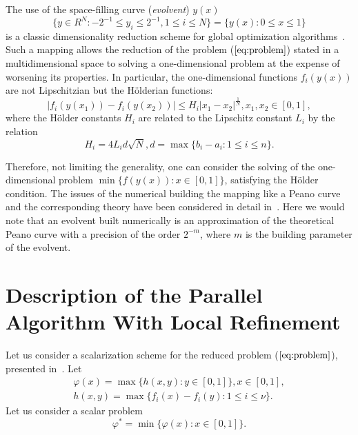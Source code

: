 \documentclass{llncs}
\begin{document}
The use of the space-filling curve (\textit{evolvent}) \(y(x)\)
\begin{displaymath}
\label{cube}
\lbrace y\in R^N:-2^{-1}\leqslant y_i\leqslant 2^{-1},1\leqslant i\leqslant
N\rbrace=\{y(x):0\leqslant x\leqslant 1\}
\end{displaymath}
is a classic dimensionality reduction scheme for global optimization algorithms~\cite{evolvents2013}.
Such a mapping allows the reduction of the problem (\(\ref{eq:problem}\)) stated in a
multidimensional space to solving a one-dimensional problem at the expense of worsening its
properties.
In particular, the one-dimensional functions \(f_i(y(x))\) are not Lipschitzian but the
H\"olderian functions:
\begin{equation}
\label{eq:holder}
|f_i(y(x_1))-f_i(y(x_2))|\leqslant H_i{|x_1-x_2|}^{\frac{1}{N}},x_1,x_2\in[0,1],
\end{equation}
where the H\"older constants \(H_i\) are related to the Lipschitz constant \(L_i\) by the relation
\begin{displaymath}
H_i=4L_id\sqrt{N},d=\max\{b_i-a_i:1\leqslant i\leqslant n\}.
\end{displaymath}
\par
Therefore, not limiting the generality, one can consider the solving of the
one-dimensional problem \(\min\{f(y(x)): x\in [0,1]\}\), satisfying the H\"older condition. The
issues of the numerical building the mapping like a Peano curve and the corresponding theory
have been considered in detail in~\cite{evolvents2013}. Here we would note that an evolvent
built numerically is an approximation of the theoretical Peano curve with a precision of the
order \(2^{-m}\), where \(m\) is the building parameter of the evolvent.

\section{Description of the Parallel Algorithm With Local Refinement}
\label{sec:algorithm}
Let us consider a scalarization scheme for the reduced problem (\(\ref{eq:problem}\)),
presented in~\cite{markinStrongin1993}. Let
\begin{eqnarray*}
  \varphi(x)=\max\{h(x,y):y\in [0,1]\},x\in [0,1],\\
  h(x,y)=\max\{f_i(x)-f_i(y):1\leqslant i\leqslant\nu\}.
\end{eqnarray*}
Let us consider a scalar problem
\begin{equation}
  \label{eq:aux_problem}
  \varphi^*=\min\{\varphi(x):x\in [0,1]\}.
\end{equation}
\end{document}
